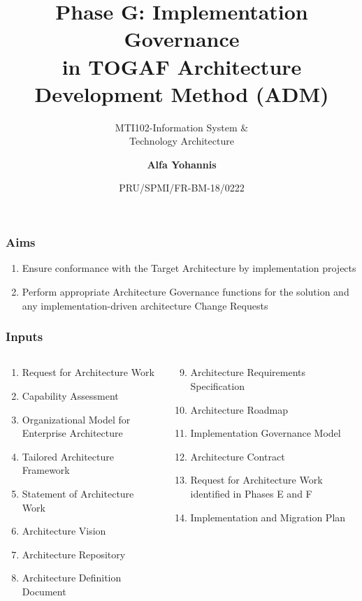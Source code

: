 \documentclass[aspectratio=169, table]{beamer}
\subtitle{MTI102-Information System \&\\Technology Architecture}
\title{\vskip-0.7cm \Large Phase G: Implementation Governance\\in TOGAF
	Architecture\\Development Method (ADM)}
\date[Serial]{\scriptsize {PRU/SPMI/FR-BM-18/0222}}
\author[Pradita]{\small {\textbf{Alfa Yohannis}}}
\begin{document}
	
	\frame{\titlepage}
	
	\begin{frame}
		\frametitle{Aims}
		\begin{enumerate}
			\item Ensure conformance with the Target Architecture by implementation projects
			\item Perform appropriate Architecture Governance functions for the solution and any implementation-driven architecture Change Requests
		\end{enumerate}	
	\end{frame}
	
	\begin{frame}
		\frametitle{Inputs}
		\vspace{22pt}
		\begin{columns}[onlytextwidth]
			\begin{column}{0.5\textwidth}
				\begin{enumerate}
					\item Request for Architecture Work
					\item Capability Assessment
					\item Organizational Model for Enterprise Architecture
					\item Tailored Architecture Framework
					\item Statement of Architecture Work
					\item Architecture Vision
					\item Architecture Repository
					\item Architecture Definition Document
					
				\end{enumerate}
				
			\end{column}
			\begin{column}{0.5\textwidth}
				\begin{enumerate}
					\setcounter{enumi}{8}
					\item Architecture Requirements Specification
					\item Architecture Roadmap
					\item Implementation Governance Model
					\item Architecture Contract
					\item Request for Architecture Work identified in Phases E and F
					\item Implementation and Migration Plan
				\end{enumerate}
			\end{column}
		\end{columns}
	\end{frame}
	
\end{document}

